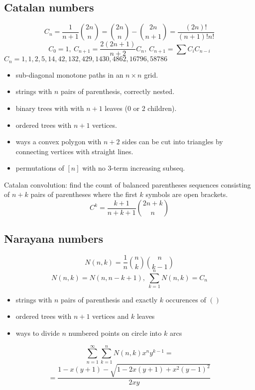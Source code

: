 	\subsection{Catalan numbers}
		\[ C_n=\frac{1}{n+1}\binom{2n}{n}= \binom{2n}{n}-\binom{2n}{n+1} = \frac{(2n)!}{(n+1)!n!} \]
		\[ C_0=1,\ C_{n+1} = \frac{2(2n+1)}{n+2}C_n,\ C_{n+1}=\sum C_iC_{n-i} \]
		${C_n = 1, 1, 2, 5, 14, 42, 132, 429, 1430, 4862, 16796, 58786}$
		\begin{itemize}[noitemsep]
			\item sub-diagonal monotone paths in an $n\times n$ grid.
			\item strings with $n$ pairs of parenthesis, correctly nested.
			\item binary trees with with $n+1$ leaves (0 or 2 children).
			\item ordered trees with $n+1$ vertices.
			\item ways a convex polygon with $n+2$ sides can be cut into triangles by connecting vertices with straight lines.
			\item permutations of $[n]$ with no 3-term increasing subseq.
		\end{itemize}
		Catalan convolution: find the count of balanced parentheses sequences consisting of $n+k$ pairs of parentheses where the first $k$ symbols are open brackets.
		\[ C^k=\frac{k+1}{n+k+1}\binom{2n+k}{n}\]
	\subsection{Narayana numbers}
		\[ N(n, k) = \frac{1}{n} \binom{n}{k} \binom{n}{k-1} \]
		\[N(n, k) = N(n, n - k + 1),\ \sum_{k=1}^{n}N(n, k) = C_n \]
		\begin{itemize}[noitemsep]
			\item strings with $n$ pairs of parenthesis and exactly $k$ occurences of $()$
			\item ordered trees with $n+1$ vertices and $k$ leaves
			\item ways to divide $n$ numbered points on circle into $k$ arcs
		\end{itemize}
		\[ \sum_{n=1}^{\infty}\sum_{k=1}^{n} N(n, k)x^{n}y^{k-1} = \]
		\[ = \frac{1 - x(y + 1) - \sqrt{1 - 2x(y+1) + x^{2}(y-1)^{2}}}{2xy} \]
